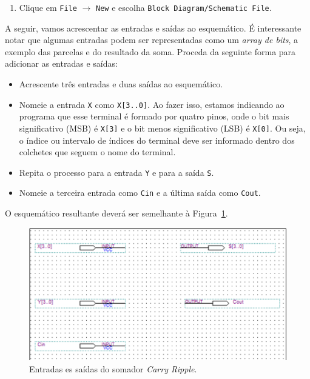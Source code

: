 \documentclass[12pt,a4paper]{article}
\begin{document}
\begin{enumerate}
    \item Clique em \texttt{File} $\rightarrow$ \texttt{New} e escolha \texttt{Block Diagram/Schematic File}.
\end{enumerate}

A seguir, vamos acrescentar as entradas e saídas ao esquemático. É interessante notar que algumas entradas podem ser representadas como um \textit{array de bits}, a exemplo das parcelas e do resultado da soma. Proceda da seguinte forma para adicionar as entradas e saídas:

\begin{itemize}
    \item Acrescente três entradas e duas saídas ao esquemático.
    \item Nomeie a entrada \texttt{X} como \texttt{X[3..0]}. Ao fazer isso, estamos indicando ao programa que esse terminal é formado por quatro pinos, onde o bit mais significativo (MSB) é \texttt{X[3]} e o bit menos significativo (LSB) é \texttt{X[0]}. Ou seja, o índice ou intervalo de índices do terminal deve ser informado dentro dos colchetes que seguem o nome do terminal.
    \item Repita o processo para a entrada \texttt{Y} e para a saída \texttt{S}.
    \item Nomeie a terceira entrada como \texttt{Cin} e a última saída como \texttt{Cout}.
\end{itemize}

O esquemático resultante deverá ser semelhante à Figura~\ref{fig:carryRipplePins}.

\begin{figure}[htbp!]
    \centering
    \includegraphics[width=\textwidth]{./figs/carryRipplePins.png}
    \caption{Entradas es saídas do somador \textit{Carry Ripple}.}
    \label{fig:carryRipplePins}
\end{figure}

\end{document}
